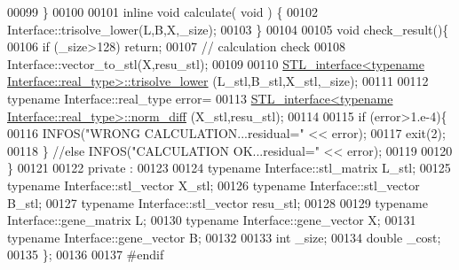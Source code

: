 \begin{DoxyCode}
00099   \}
00100 
00101   \textcolor{keyword}{inline} \textcolor{keywordtype}{void} calculate( \textcolor{keywordtype}{void} ) \{
00102       Interface::trisolve\_lower(L,B,X,\_size);
00103   \}
00104 
00105   \textcolor{keywordtype}{void} check\_result()\{
00106     \textcolor{keywordflow}{if} (\_size>128) \textcolor{keywordflow}{return};
00107     \textcolor{comment}{// calculation check}
00108     Interface::vector\_to\_stl(X,resu\_stl);
00109 
00110     \hyperlink{class_s_t_l__interface}{STL\_interface<typename Interface::real\_type>::trisolve\_lower}
      (L\_stl,B\_stl,X\_stl,\_size);
00111 
00112     \textcolor{keyword}{typename} Interface::real\_type error=
00113       \hyperlink{class_s_t_l__interface}{STL\_interface<typename Interface::real\_type>::norm\_diff}
      (X\_stl,resu\_stl);
00114 
00115     \textcolor{keywordflow}{if} (error>1.e-4)\{
00116       INFOS(\textcolor{stringliteral}{"WRONG CALCULATION...residual="} << error);
00117       exit(2);
00118     \} \textcolor{comment}{//else INFOS("CALCULATION OK...residual=" << error);}
00119 
00120   \}
00121 
00122 private :
00123 
00124   \textcolor{keyword}{typename} Interface::stl\_matrix L\_stl;
00125   \textcolor{keyword}{typename} Interface::stl\_vector X\_stl;
00126   \textcolor{keyword}{typename} Interface::stl\_vector B\_stl;
00127   \textcolor{keyword}{typename} Interface::stl\_vector resu\_stl;
00128 
00129   \textcolor{keyword}{typename} Interface::gene\_matrix L;
00130   \textcolor{keyword}{typename} Interface::gene\_vector X;
00131   \textcolor{keyword}{typename} Interface::gene\_vector B;
00132 
00133   \textcolor{keywordtype}{int} \_size;
00134   \textcolor{keywordtype}{double} \_cost;
00135 \};
00136 
00137 \textcolor{preprocessor}{#endif}
\end{DoxyCode}
